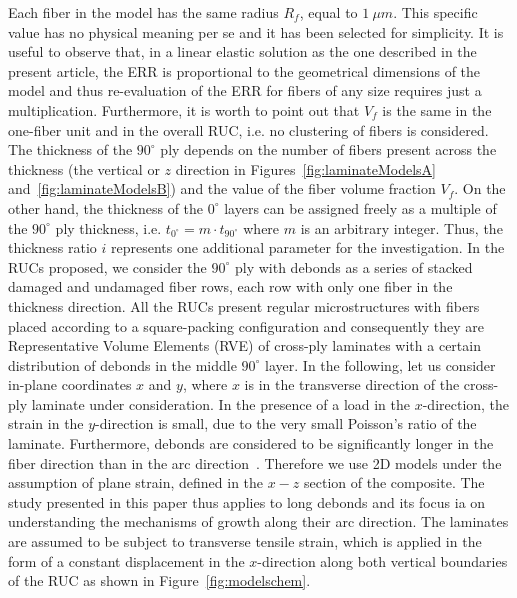 \documentclass[review]{elsarticle}
\begin{document}
Each fiber in the model has the same radius $R_{f}$, equal to $1\ \mu m$. This specific value has no physical meaning per se and it has been selected for simplicity. It is useful to observe that, in a linear elastic solution as the one described in the present article, the ERR is proportional to the geometrical dimensions of the model and thus re-evaluation of the ERR for fibers of any size requires just a multiplication. Furthermore, it is worth to point out that $V_{f}$ is the same in the one-fiber unit and in the overall RUC, i.e. no clustering of fibers is considered. 
The thickness of the $90^{\circ}$ ply depends on the number of fibers present across the thickness (the vertical or $z$ direction in Figures~\ref{fig:laminateModelsA} and~\ref{fig:laminateModelsB}) and the value of the fiber volume fraction $V_{f}$. On the other hand, the thickness of the $0^{\circ}$ layers can be assigned freely as a multiple of the $90^{\circ}$ ply thickness, i.e. $t_{0^{\circ}}=m\cdot t_{90^{\circ}}$ where $m$ is an arbitrary integer. Thus, the thickness ratio $i$ represents one additional parameter for the investigation. In the RUCs proposed, we consider the $90^{\circ}$ ply with debonds as a series of stacked damaged and undamaged fiber rows, each row with only one fiber in the thickness direction.
All the RUCs present regular microstructures with fibers placed according to a square-packing configuration and consequently they are Representative Volume Elements (RVE) of cross-ply laminates with a certain distribution of debonds in the middle $90^{\circ}$ layer.
In the following, let us consider in-plane coordinates $x$ and $y$, where $x$ is in the transverse direction of the cross-ply laminate under consideration. In the presence of a load in the $x$-direction, the strain in the $y$-direction is small, due to the very small Poisson's ratio of the laminate. Furthermore, debonds are considered to be significantly longer in the fiber direction than in the arc direction~\cite{Zhang1997}. Therefore we use 2D models under the assumption of plane strain, defined in the $x-z$ section of the composite. The study presented in this paper thus applies to long debonds and its focus ia on understanding the mechanisms of growth along their arc direction. The laminates are assumed to be subject to transverse tensile strain, which is applied in the form of a constant displacement in the $x$-direction along both vertical boundaries of the RUC as shown in  Figure~\ref{fig:modelschem}.\\
\end{document}

